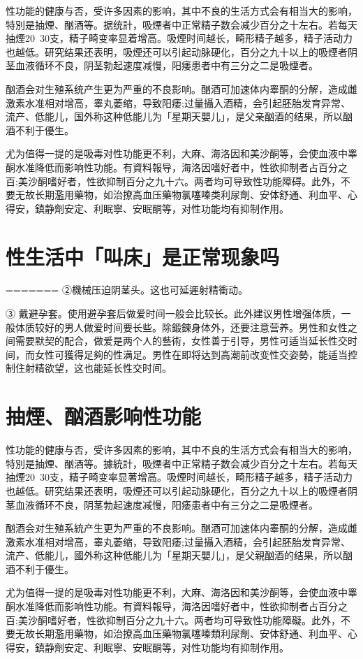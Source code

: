\documentclass[12pt,UTF8]{ctexbook}
\begin{document}
性功能的健康与否，受许多因素的影响，其中不良的生活方式会有相当大的影响，特別是抽煙、酗酒等。据统計，吸煙者中正常精子数会减少百分之十左右。若每天抽煙20~30支，精子畸变率显着增高。吸煙时间越长，畸形精子越多，精子活动力也越低。研究结果还表明，吸煙还可以引起动脉硬化，百分之九十以上的吸煙者阴茎血液循环不良，阴茎勃起速度减慢，阳痿患者中有三分之二是吸煙者。

酗酒会对生殖系统产生更为严重的不良影响。酗酒可加速体内睾酮的分解，造成雌激素水准相对增高，睾丸萎缩，导致阳痿;过量攝入酒精，会引起胚胎发育异常、流产、低能儿，国外称这种低能儿为「星期天嬰儿」，是父亲酗酒的结果，所以酗酒不利于優生。

尤为值得一提的是吸毒对性功能更不利，大麻、海洛因和美沙酮等，会使血液中睾酮水准降低而影响性功能。有資料報导，海洛因嗜好者中，性欲抑制者占百分之百;美沙酮嗜好者，性欲抑制百分之九十六。两者均可导致性功能障碍。此外，不要无故长期濫用藥物，如治撩高血压藥物氯噻嗪类利尿劑、安体舒通、利血平、心得安，鎮静劑安定、利眠寧、安眠酮等，对性功能均有抑制作用。

\section{性生活中「叫床」是正常现象吗}
=======
②機械压迫阴茎头。这也可延遲射精衝动。

③ 戴避孕套。使用避孕套后做爱时间一般会比较长。此外建议男性增强体质，一般体质较好的男人做爱时间要长些。除鍛鍊身体外，还要注意营养。男性和女性之间需要默契的配合，做爱是两个人的藝術，女性善于引导，男性可适当延长性交时间，而女性可獲得足夠的性满足。男性在即将达到高潮前改变性交姿勢，能适当控制住射精欲望，这也能延长性交时间。

\section{抽煙、酗酒影响性功能}

性功能的健康与否，受许多因素的影响，其中不良的生活方式会有相当大的影响，特別是抽煙、酗酒等。據統計，吸煙者中正常精子数会减少百分之十左右。若每天抽煙20~30支，精子畸变率显著增高。吸煙时间越长，畸形精子越多，精子活动力也越低。研究结果还表明，吸煙还可以引起动脉硬化，百分之九十以上的吸煙者阴茎血液循环不良，阴茎勃起速度减慢，阳痿患者中有三分之二是吸煙者。

酗酒会对生殖系統产生更为严重的不良影响。酗酒可加速体内睾酮的分解，造成雌激素水准相对增高，睾丸萎缩，导致阳痿;过量攝入酒精，会引起胚胎发育异常、流产、低能儿，國外称这种低能儿为「星期天嬰儿」，是父親酗酒的结果，所以酗酒不利于優生。

尤为值得一提的是吸毒对性功能更不利，大麻、海洛因和美沙酮等，会使血液中睾酮水准降低而影响性功能。有資料報导，海洛因嗜好者中，性欲抑制者占百分之百;美沙酮嗜好者，性欲抑制百分之九十六。两者均可导致性功能障礙。此外，不要无故长期濫用藥物，如治撩高血压藥物氯噻嗪類利尿劑、安体舒通、利血平、心得安，鎮静劑安定、利眠寧、安眠酮等，对性功能均有抑制作用。
\end{document}
